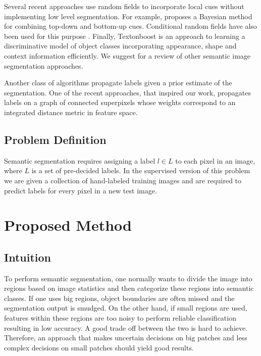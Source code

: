 \documentclass{article} %
\begin{document}
Several recent approaches use random fields to incorporate local cues without implementing low level segmentation. For example, \cite{Kumar:2005:OC:1068507.1068889} proposes a Bayesian method for combining top-down and bottom-up cues. Conditional random fields have also been used for this purpose \cite{Kumar:2005:HFF:1097115.1097790} \cite{Richard04multiscaleconditional}. Finally, Textonboost \cite{Shotton06textonboost:joint} is an approach to learning a discriminative model of object classes incorporating appearance, shape and context information efficiently. We suggest \cite{SegmentRegionsParts} for a review of other semantic image segmentation approaches.

Another class of algorithms propagate labels given a prior estimate of the segmentation. One of the recent approaches, that inspired our work, propagates labels on a graph of connected superpixels whose weights correspond to an integrated distance metric in feature space.


\subsection{Problem Definition}
\label{sec:Problem}
Semantic segmentation requires assigning a label $l \in L$ to each pixel in an image, where $L$ is a set of pre-decided labels. In the supervised version of this problem we are given a collection of hand-labeled training images and are required to predict labels for every pixel in a new test image. 

\section{Proposed Method}
\label{sec:Proposed}
\subsection{Intuition}
\label{sec:intuition}
To perform semantic segmentation, one normally wants to divide the image into regions based on image statistics and then categorize these regions into semantic classes. If one uses big regions, object boundaries are often missed and the segmentation output is smudged. On the other hand, if small regions are used, features within these regions are too noisy to perform reliable classification resulting in low accuracy. A good trade off between the two is hard to achieve. Therefore, an approach that makes uncertain decisions on big patches and less complex decisions on small patches should yield good results. 
\end{document}
